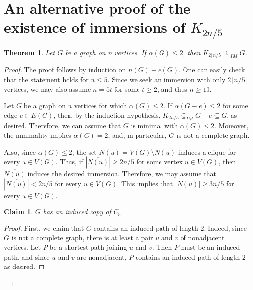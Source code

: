 \documentclass[a4paper,12pt]{article}
\newtheorem{theorem}{Theorem}
\newtheorem{claim}{Claim}[theorem]
\newcommand{\imm}{\subseteq_{IM}}
\begin{document}
\section{An alternative proof of the existence of immersions of $K_{2n/5}$}




\begin{theorem}
    Let \(G\) be a graph on \(n\) vertices.
    If $\alpha(G)\leq 2$, then $K_{2\lfloor n/5\rfloor}\imm G$.
\end{theorem}
\begin{proof}
    The proof follows by induction on \(n(G) + e(G)\).
    One can easily check that the statement holds for \(n\leq 5\).
    Since we seek an immersion with only $2\lfloor n/5\rfloor$ vertices, we may also assume $n=5t$ for some $t\geq2$, and thus \(n\geq 10\).

    Let \(G\) be a graph on \(n\) vertices for which \(\alpha(G) \leq 2\).
    If \(\alpha(G-e) \leq 2\) for some edge \(e\in E(G)\),
    then, by the induction hypothesis, \(K_{2n/5} \imm G-e \subseteq G\), as desired.
    Therefore, we can assume that \(G\) is minimal with \(\alpha(G) \leq 2\).
    Moreover, the minimality implies \(\alpha(G) = 2\),
    and, in particular, \(G\) is not a complete graph.

    Also,
    since $\alpha(G)\leq 2$, 
    the set $\overline{N(u)} = V(G)\setminus N(u)$ induces a clique for every $u\in V(G)$.
    Thus, if \(|\overline{N(u)}| \geq 2n/5\) for some vertex \(u\in V(G)\),
    then \(\overline{N(u)}\) induces the desired immersion.
    Therefore, we may assume that \(|\overline{N(u)}| < 2n/5\)
    for every \(u\in V(G)\).
    This implies that \(|N(u)| \geq 3n/5\) for every \(u\in V(G)\).
    


   
\begin{claim}
    \(G\) has an induced copy of \(C_5\)
\end{claim}
\begin{proof}
    First, we claim that \(G\) contains an induced path of length \(2\).
    Indeed,
    since \(G\) is not a complete graph, 
    there is at least a pair \(u\) and \(v\) of nonadjacent vertices.
    Let \(P\) be a shortest path joining \(u\) and \(v\).
    Then \(P\) must be an induced path, and since \(u\) and \(v\) are nonadjacent, \(P\) contains  an induced path of length \(2\) as desired.


\end{proof}
\end{proof}
\end{document}
